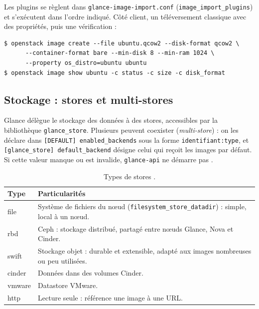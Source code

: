 Les plugins se règlent dans \texttt{glance-image-import.conf} (\texttt{image\_import\_plugins}) et s'exécutent dans l'ordre indiqué.
Côté client, un téléversement classique avec des propriétés, puis une vérification :

\par\noindent\begin{minipage}{\linewidth}
\begin{lstlisting}[style=terminal]
$ openstack image create --file ubuntu.qcow2 --disk-format qcow2 \
      --container-format bare --min-disk 8 --min-ram 1024 \
      --property os_distro=ubuntu ubuntu
$ openstack image show ubuntu -c status -c size -c disk_format
\end{lstlisting}
\end{minipage}\par

\subsection{Stockage : stores et multi-stores}\label{sec:gl-stores}

Glance délègue le stockage des données à des \glspl{store}, accessibles par la bibliothèque \texttt{glance\_store}.
Plusieurs peuvent coexister (\emph{multi-store}) : on les déclare dans \texttt{[DEFAULT] enabled\_backends} sous la forme
\texttt{identifiant:type}, et \texttt{[glance\_store] default\_backend} désigne celui qui reçoit les images par défaut. Si
cette valeur manque ou est invalide, \texttt{glance-api} ne démarre pas \parencite{glance-multistore}.

\begin{table}[!ht]
\centering
\renewcommand{\arraystretch}{1.3}
\begin{tabular}{@{}>{\raggedright\arraybackslash\ttfamily}p{2.2cm}>{\raggedright\arraybackslash}p{13.3cm}@{}}
\toprule
\textrm{\textbf{Type}} & \textbf{Particularités} \\
\midrule
file & Système de fichiers du nœud (\texttt{filesystem\_store\_datadir}) : simple, local à un nœud. \\
rbd & Ceph : stockage distribué, partagé entre nœuds Glance, Nova et Cinder. \\
swift & Stockage objet : durable et extensible, adapté aux images nombreuses ou peu utilisées. \\
cinder & Données dans des volumes Cinder. \\
vmware & Datastore VMware. \\
http & Lecture seule : référence une image à une URL. \\
\bottomrule
\end{tabular}
\caption{Types de stores \parencite{glance-multistore}.}
\label{tab:gl-stores}
\end{table}

